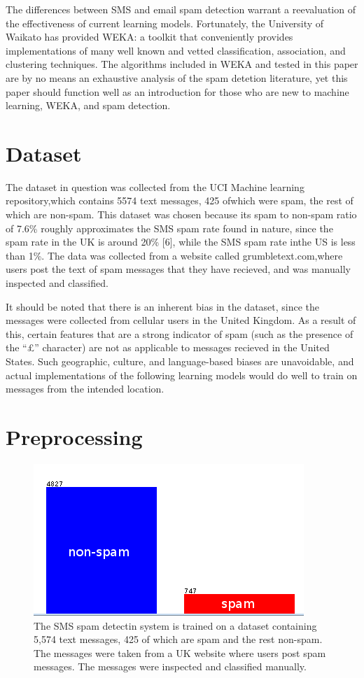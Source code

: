 \documentclass[letterpaper, 10 pt, conference]{ieeeconf}  %
\begin{document}
The differences between SMS and email spam detection warrant a
reevaluation of the effectiveness of current learning
models. Fortunately, the University of Waikato has provided WEKA: a
toolkit that conveniently provides implementations of many well known
and vetted classification, association, and clustering techniques. The
algorithms included in WEKA and tested in this paper are by no means
an exhaustive analysis of the spam detetion literature, yet this paper
should function well as an introduction for those who are new to
machine learning, WEKA, and spam detection.

\section{Dataset}
The dataset in question was collected from the UCI Machine learning
repository,which contains 5574 text messages, 425 ofwhich were spam,
the rest of which are non-spam. This dataset was chosen because its
spam to non-spam ratio of 7.6\% roughly approximates the SMS spam rate
found in nature, since the spam rate in the UK is around 20\% [6],
while the SMS spam rate inthe US is less than 1\%. The data was
collected from a website called grumbletext.com,where users post the
text of spam messages that they have recieved, and was manually
inspected and classified.

It should be noted that there is an inherent bias in the dataset,
since the messages were collected from cellular users in the United
Kingdom. As a result of this, certain features that are a strong
indicator of spam (such as the presence of the ``£'' character) are
not as applicable to messages recieved in the United States. Such
geographic, culture, and language-based biases are unavoidable, and
actual implementations of the following learning models would do well
to train on messages from the intended location.

\section{Preprocessing}
\begin{figure}[t]
\centering
\includegraphics[width=0.9\columnwidth]{figures/spam_ham.png}
\caption{ The SMS spam detectin system is trained on a dataset
  containing 5,574 text messages, 425 of which are spam and the rest
  non-spam. The messages were taken from a UK website where users post
  spam messages. The messages were inspected and classified manually.
}
\label{fig:perception-pipeline}
\end{figure}
\end{document}
